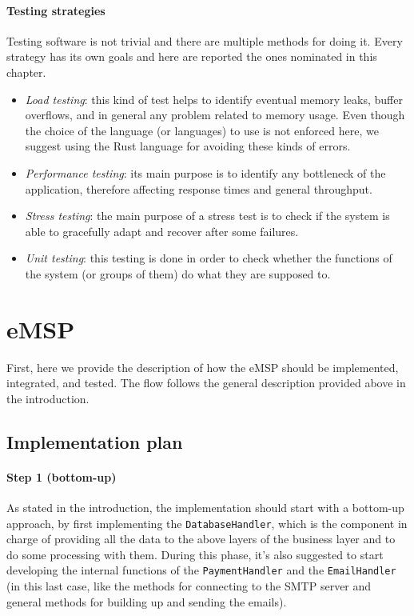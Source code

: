 \paragraph{Testing strategies} Testing software is not trivial and there are multiple methods for doing it. Every strategy has its own goals and here are reported the ones nominated in this chapter.
\begin{itemize}
    \item \textit{Load testing}: this kind of test helps to identify eventual memory leaks, buffer overflows, and in general any problem related to memory usage. Even though the choice of the language (or languages) to use is not enforced here, we suggest using the Rust language for avoiding these kinds of errors.
    \item \textit{Performance testing}: its main purpose is to identify any bottleneck of the application, therefore affecting response times and general throughput.
    \item \textit{Stress testing}: the main purpose of a stress test is to check if the system is able to gracefully adapt and recover after some failures.
    \item \textit{Unit testing}: this testing is done in order to check whether the functions of the system (or groups of them) do what they are supposed to.
\end{itemize}

\vfill

\pagebreak

\section{eMSP}

First, here we provide the description of how the eMSP should be implemented, integrated, and tested. The flow follows the general description provided above in the introduction.

\subsection{Implementation plan}

\paragraph{Step 1 (bottom-up)}\label{emsp:bottomup} As stated in the introduction, the implementation should start with a bottom-up approach, by first implementing the \texttt{DatabaseHandler}, which is the component in charge of providing all the data to the above layers of the business layer and to do some processing with them. During this phase, it's also suggested to start developing the internal functions of the \texttt{PaymentHandler} and the \texttt{EmailHandler} (in this last case, like the methods for connecting to the SMTP server and general methods for building up and sending the emails).

